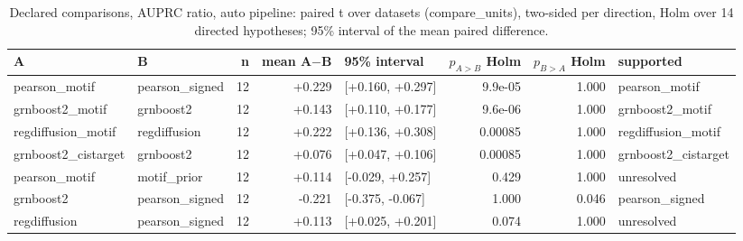 \begin{table}[H]\centering\small
\caption{Declared comparisons, AUPRC ratio, auto pipeline: paired t over datasets (compare\_units), two-sided per direction, Holm over 14 directed hypotheses; 95\% interval of the mean paired difference.}
\begin{tabular}{llrrlrrl}\toprule
A & B & n & mean A$-$B & 95\% interval & $p_{A>B}$ Holm & $p_{B>A}$ Holm & supported \\ \midrule
pearson\_motif & pearson\_signed & 12 & +0.229 & [+0.160, +0.297] & 9.9e-05 & 1.000 & pearson\_motif \\
grnboost2\_motif & grnboost2 & 12 & +0.143 & [+0.110, +0.177] & 9.6e-06 & 1.000 & grnboost2\_motif \\
regdiffusion\_motif & regdiffusion & 12 & +0.222 & [+0.136, +0.308] & 0.00085 & 1.000 & regdiffusion\_motif \\
grnboost2\_cistarget & grnboost2 & 12 & +0.076 & [+0.047, +0.106] & 0.00085 & 1.000 & grnboost2\_cistarget \\
pearson\_motif & motif\_prior & 12 & +0.114 & [-0.029, +0.257] & 0.429 & 1.000 & unresolved \\
grnboost2 & pearson\_signed & 12 & -0.221 & [-0.375, -0.067] & 1.000 & 0.046 & pearson\_signed \\
regdiffusion & pearson\_signed & 12 & +0.113 & [+0.025, +0.201] & 0.074 & 1.000 & unresolved \\
\bottomrule\end{tabular}\end{table}
